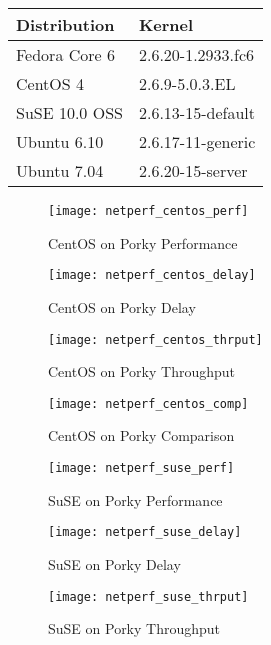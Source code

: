 \documentclass[letterpaper,final,notitlepage,twocolumn,10pt,twoside]{article}
\begin{document}
\begin{tabular}{ll}\\
Distribution & Kernel\\
\hline
Fedora Core 6 & 2.6.20-1.2933.fc6\\
CentOS 4 & 2.6.9-5.0.3.EL\\
SuSE 10.0 OSS & 2.6.13-15-default\\
Ubuntu 6.10 & 2.6.17-11-generic\\
Ubuntu 7.04 & 2.6.20-15-server\\
\end{tabular}

\begin{figure}[p]
\center\texttt{[image: netperf\_centos\_perf]}
\caption[CentOS on Porky Performance]{CentOS on Porky Performance}
\label{figure:centosperf}
\end{figure}

\begin{figure}[p]
\center\texttt{[image: netperf\_centos\_delay]}
\caption[CentOS on Porky Delay]{CentOS on Porky Delay}
\label{figure:centosdly}
\end{figure}

\begin{figure}[p]
\center\texttt{[image: netperf\_centos\_thrput]}
\caption[CentOS on Porky Throughput]{CentOS on Porky Throughput}
\label{figure:centosthrput}
\end{figure}

\begin{figure}[p]
\center\texttt{[image: netperf\_centos\_comp]}
\caption[CentOS on Porky Comparison]{CentOS on Porky Comparison}
\label{figure:centoscomp}
\end{figure}

\begin{figure}[p]
\center\texttt{[image: netperf\_suse\_perf]}
\caption[SuSE on Porky Performance]{SuSE on Porky Performance}
\label{figure:suseperf}
\end{figure}

\begin{figure}[p]
\center\texttt{[image: netperf\_suse\_delay]}
\caption[SuSE on Porky Delay]{SuSE on Porky Delay}
\label{figure:susedly}
\end{figure}

\begin{figure}[p]
\center\texttt{[image: netperf\_suse\_thrput]}
\caption[SuSE on Porky Throughput]{SuSE on Porky Throughput}
\label{figure:susethrput}
\end{figure}
\end{document}
